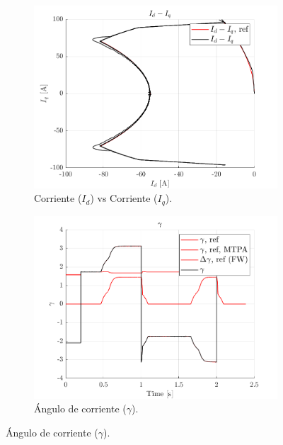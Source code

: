 \begin{figure}[H]
    \begin{subfigure}{0.4\textwidth}
        \includegraphics[width=\linewidth]{fig/PLECS_id-iq.png}
        \caption{Corriente ($I_{d}$) vs Corriente ($I_{q}$).}
    \end{subfigure}
    \begin{subfigure}{0.4\textwidth}
        \includegraphics[width=\linewidth]{fig/PLECS_gamma.png}
        \caption{Ángulo de corriente ($\gamma$).}
    \end{subfigure}


\end{figure}
